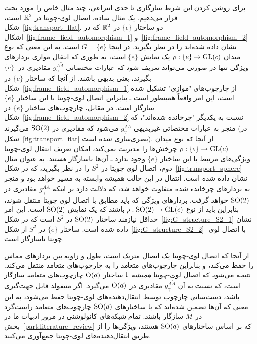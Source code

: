 برای روشن کردن این شرط سازگاری تا حدی انتزاعی، چند مثال خاص را مورد بحث قرار می‌دهیم.
یک مثال ساده، اتصال لوی-چویتا در $\mathbb{R}^2$ است، شکل~\ref{fig:transport_flat}.
دو ساختار $\{e\}$ در $\mathbb{R}^2$ که در اشکال~\ref{fig:frame_field_automorphism_1} و~\ref{fig:frame_field_automorphism_2} نشان داده شده‌اند را در نظر بگیرید.
در اینجا $G=\{e\}$ است، به این معنی که نوع میدان $\rho: \{e\} \to \operatorname{GL}(c)$ یک نمایش $\{e\}$ است، به طوری که انتقال موازی بردارهای ویژگی تنها در صورتی می‌تواند تعریف شود که عبارات مختصاتی $g_\gamma^{A\widetilde{A}}$ مقادیری در~$\{e\}$ بگیرند، یعنی بدیهی باشند.
از آنجا که ساختار $\{e\}$ در شکل~\ref{fig:frame_field_automorphism_1} از چارچوب‌های "موازی" تشکیل شده است، این امر واقعاً همینطور است ـ بنابراین اتصال لوی-چویتا با این ساختار $\{e\}$ سازگار است.
در مقابل، چارچوب‌های ساختار $\{e\}$ در شکل~\ref{fig:frame_field_automorphism_2} نسبت به یکدیگر "چرخانده شده‌اند"، که منجر به عبارات مختصاتی غیربدیهی $g_\gamma^{A\widetilde{A}}$ می‌شود که مقادیری در $\operatorname{SO}(2)$ می‌گیرند (در شکل~\ref{fig:transport_flat} بصری‌سازی شده است).
از آنجا که نوع میدان $\rho: \{e\} \to \operatorname{GL}(c)$ چرخش‌ها را مدیریت نمی‌کند، امکان تعریف انتقال لوی-چویتا ویژگی‌های مرتبط با این ساختار $\{e\}$ وجود ندارد ـ آن‌ها ناسازگار هستند.
به عنوان مثال دوم، اتصال لوی-چویتا در $S^2$ را در نظر بگیرید، که در شکل~\ref{fig:transport_sphere} نشان داده شده است.
انتقال در این حالت همیشه وابسته به مسیر خواهد بود و منجر به بردارهای چرخانده شده متفاوت خواهد شد، که دلالت دارد بر اینکه $g_\gamma^{A\widetilde{A}}$ مقادیری در $\operatorname{SO}(2)$ خواهد گرفت.
بردارهای ویژگی که باید مطابق با اتصال لوی-چویتا منتقل شوند، بنابراین باید از نوع $\rho: \operatorname{SO}(2) \to \operatorname{GL}(c)$ باشند که یک نمایش $\operatorname{SO}(2)$ است.
این امر حداقل نیازمند ساختار $\operatorname{SO}(2)$ در $S^2$ است که در شکل~\ref{fig:G_structure_S2_1} نشان داده شده است.
ساختار $\{e\}$ در $S^2$ از شکل~\ref{fig:G_structure_S2_2} با اتصال لوی-چویتا ناسازگار است.


از آنجا که اتصال لوی-چویتا یک اتصال متریک است، طول و زاویه بین بردارهای مماس را حفظ می‌کند، و بنابراین چارچوب‌های متعامد را به چارچوب‌های متعامد منتقل می‌کند.
نتیجه می‌شود که اتصال لوی-چویتا \emph{همیشه} با ساختار $\operatorname{O}(d)$ چارچوب‌های متعامد سازگار است، که نسبت به آن $g_\gamma^{A\widetilde{A}}$ مقادیری در~$\operatorname{O}(d)$ می‌گیرد.
اگر منیفولد قابل جهت‌گیری باشد، دست‌سانی چارچوب توسط انتقال‌دهنده‌های لوی-چویتا حفظ می‌شود، به این معنی که آن‌ها تضمین شده‌اند که با ساختارهای $\operatorname{SO}(d)$ چارچوب‌های متعامد راست‌گرد در~$M$ سازگار باشند.
تمام شبکه‌های کانولوشنی در مرور ادبیات ما در بخش~\ref{part:literature_review} که بر اساس ساختارهای $\operatorname{SO}(d)$ هستند، ویژگی‌ها را از طریق انتقال‌دهنده‌های لوی-چویتا جمع‌آوری می‌کنند.


